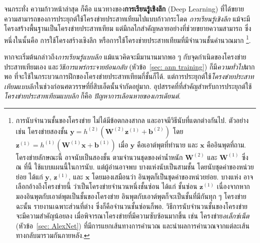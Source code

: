 จนกระทั่ง ความก้าวหน้าล่าสุด
ก็คือ แนวทางของ\textbf{การเรียนรู้เชิงลึก} (Deep Learning)
ที่ได้ขยายความสามารถของการประยุกต์ใช้โครงข่ายประสาทเทียมไปแบบก้าวกระโดด
\textit{การเรียนรู้เชิงลึก} แม้จะมีโครงสร้างพื้นฐานเป็นโครงข่ายประสาทเทียม
แต่มีกลไกสำคัญหลายอย่างที่ช่วยขยายความสามารถ
ซึ่งหนึ่งในนั้นคือ การใช้โครงสร้างเชิงลึก หรือการใช้โครงข่ายประสาทเทียมที่มีจำนวนชั้นคำนวณมาก%
\footnote{%
การนับจำนวนชั้นของโครงข่าย ไม่ได้มีข้อตกลงสากล และอาจมีวิธีนับที่แตกต่างกันไป.
ตัวอย่าง เช่น
โครงข่ายสองชั้น $\bm{y} =h^{(2)}(\bm{W}^{(2)} \bm{z}^{(1)} + \bm{b}^{(2)})$
โดย $\bm{z}^{(1)} =h^{(1)}(\bm{W}^{(1)} \bm{x} + \bm{b}^{(1)})$
เมื่อ $\bm{y}$ คือเอาต์พุตที่ทำนาย
และ $\bm{x}$ คืออินพุตที่ถาม.
โครงข่ายลักษณะนี้ อาจนับเป็นสองชั้น ตามจำนวนชุดของค่าน้ำหนัก $\bm{W}^{(2)}$
และ $\bm{W}^{(1)}$
ซึ่ง ณ ที่นี้ ใช้แบบแผนนี้ในการนับ.
แต่ผู้อ่านอาจพบ บางแห่งนับเป็นสามชั้น โดยนับชุดค่าของหน่วยย่อย ได้แก่ $\bm{y}$, $\bm{z}^{(1)}$, และ $\bm{x}$ โดยมองเสมือนว่า อินพุตก็เป็นชุดค่าของหน่วยย่อย.
บางแห่ง อาจเลือกอ้างถึงโครงข่ายนี้
ว่าเป็นโครงข่ายจำนวนหนึ่งชั้นซ่อน ได้แก่ ชั้นซ่อน $\bm{z}^{(1)}$
เนื่องจากหากมองอินพุตกับเอาต์พุตเป็นชั้นของโครงข่าย อินพุตกับเอาต์พุตก็จะเป็นชั้นที่มีกันทุก ๆ โครงข่าย ฉะนั้น รายงานเฉพาะส่วนที่ต่าง  ซึ่งก็คือจำนวนชั้นซ่อนก็พอ.
วิธีการนับจำนวนชั้นของโครงข่าย
จะมีความสำคัญน้อยลง เมื่อพิจารณาโครงข่ายที่มีความซับซ้อนมากขึ้น
เช่น โครงข่าย\textit{อเล็กซ์เน็ต} (หัวข้อ~\ref{sec: AlexNet}) ที่มีการแยกเส้นทางการคำนวณ
และนำผลการคำนวณจากแต่ละเส้นทางกลับมารวมกันภายหลัง. 
}.

%

หากจะเริ่มต้นกล่าวถึง\textit{การเรียนรู้แบบลึก} แม้แนวคิดจะมีมานานมากพอ ๆ กับจุดกำเนิดของโครงข่ายประสาทเทียมเอง 
และ\textit{วิธีการแพร่กระจายย้อนกลับ} (ฺหัวข้อ~\ref{sec: ann training}) ก็มี\textit{ความทั่วไป}มากพอ ที่จะใช้ในกระบวนการฝึกของโครงข่ายประสาทเทียมกี่ชั้นก็ได้. %
แต่การประยุกต์ใช้\textit{โครงข่ายประสาทเทียมแบบลึก}ในช่วงก่อนศตวรรษที่ยี่สิบเอ็ดนั้นจำกัดอยู่มาก.
อุปสรรคที่ที่สำคัญสำหรับการประยุกต์ใช้\textit{โครงข่ายประสาทเทียมแบบลึก} ก็คือ \textit{ปัญหาการเลือนหายของเกรเดียนต์}.

